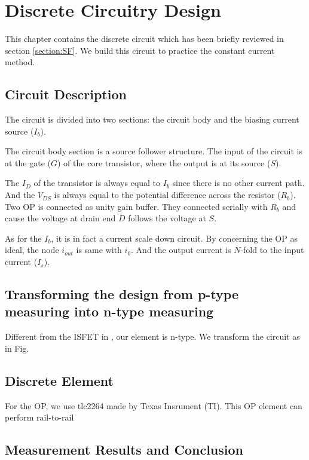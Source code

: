 \chapter{Discrete Circuitry Design}
This chapter contains the discrete circuit which has been briefly reviewed in section \ref{section:SF}.
We build this circuit to practice the constant current method.


\section{Circuit Description}
The circuit is divided into two sections: the circuit body and the biasing current source ($I_b$).

The circuit body section is a source follower structure.
The input of the circuit is at the gate ($G$) of the core transistor, where the output is at its source ($S$).

The $I_D$ of the transistor is always equal to $I_b$ since there is no other current path.
And the $V_{DS}$ is always equal to the potential difference across the resistor ($R_b$).
Two OP is connected as unity gain buffer.
They connected serially with $R_b$ and cause the voltage at drain end $D$ follows the voltage at $S$.

As for the $I_b$, it is in fact a current scale down circuit.
By concerning the OP as ideal, the node $i_{out}$ is same with $i_0$.
And the output current is $N$-fold to the input current ($I_s$).

\section{Transforming the design from p-type measuring into n-type measuring}
Different from the ISFET in \cite{SF1}, our element is n-type.
We transform the circuit as in Fig.

\section{Discrete Element}
For the OP, we use tlc2264 made by Texas Insrument (TI).
This OP element can perform rail-to-rail 

\section{Measurement Results and Conclusion}

